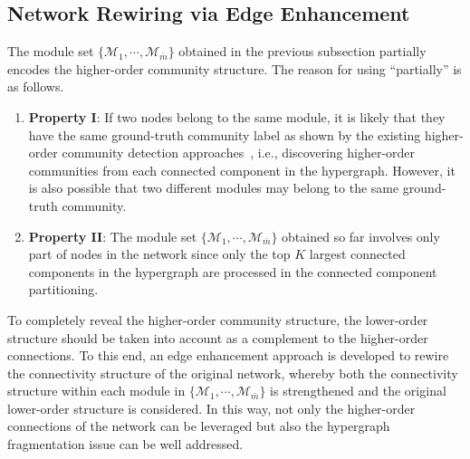 \documentclass[sigconf]{acmart}
\begin{document}
\subsection{Network Rewiring via Edge Enhancement}



The module set $\{\mathcal{M}_{1},\cdots, \mathcal{M}_{\bar{m}}\}$ obtained in the previous subsection partially encodes the higher-order community structure. The reason for using ``partially'' is as follows.
\begin{enumerate}[{1)}]
\item \textbf{Property I}: If two nodes belong to the same module, it is likely that they have the same ground-truth community label as shown by the existing higher-order community detection approaches~\cite{arenas2008motif,benson2016higher}, i.e., discovering higher-order communities from each connected component in the hypergraph. However, it is also possible that two different modules may belong to the same ground-truth community.
\item \textbf{Property II}: The module set $\{\mathcal{M}_{1},\cdots, \mathcal{M}_{\bar{m}}\}$ obtained so far involves only part of nodes in the network since only the top $K$ largest connected components in the hypergraph are processed in the connected component partitioning.
\end{enumerate}

To completely reveal the higher-order community structure, the lower-order structure should be taken into account as a complement to the higher-order connections. To this end, an edge enhancement approach is developed to rewire the connectivity structure of the original network, whereby both the connectivity structure within each module in $\{\mathcal{M}_{1},\cdots, \mathcal{M}_{\bar{m}}\}$ is strengthened and the original lower-order structure is considered. In this way, not only the higher-order connections of the network can be leveraged but also the hypergraph fragmentation issue can be well addressed.
\end{document}
